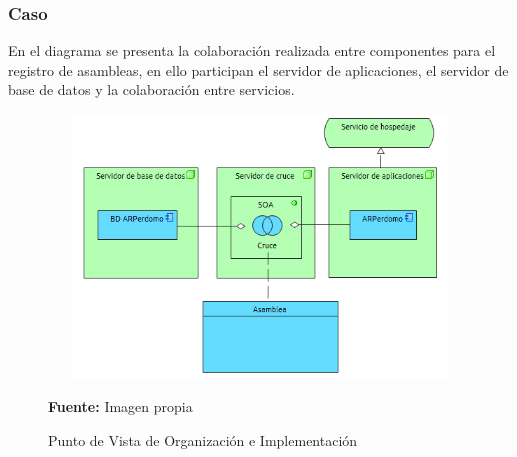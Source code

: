 \subsubsection{Caso}

En el diagrama se presenta la colaboración realizada entre componentes para el registro de asambleas, en ello participan el servidor de aplicaciones, el servidor de base de datos y la colaboración entre servicios.

\begin{figure}[th!]
	\centering
	\includegraphics[width=12cm,height=7cm]{arquitectura/tecnologia/imgs/organizacion}
	\caption{Punto de Vista de Organización e Implementación}{\scriptsize \textbf{Fuente:} Imagen propia}
\end{figure}
\newpage